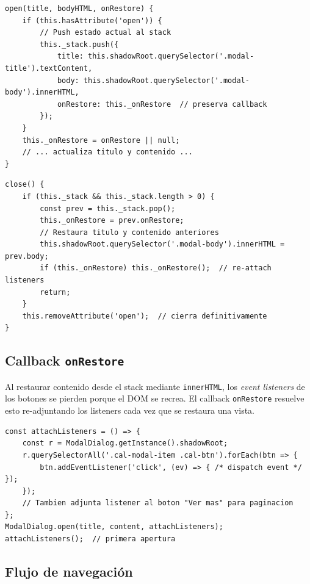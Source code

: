 \documentclass[12pt,a4paper]{article}
\begin{document}
\begin{lstlisting}[caption={Método \texttt{open()} con stack}, label=lst:stack-open]
open(title, bodyHTML, onRestore) {
    if (this.hasAttribute('open')) {
        // Push estado actual al stack
        this._stack.push({
            title: this.shadowRoot.querySelector('.modal-title').textContent,
            body: this.shadowRoot.querySelector('.modal-body').innerHTML,
            onRestore: this._onRestore  // preserva callback
        });
    }
    this._onRestore = onRestore || null;
    // ... actualiza titulo y contenido ...
}
\end{lstlisting}

\begin{lstlisting}[caption={Método \texttt{close()} con restauración}, label=lst:stack-close]
close() {
    if (this._stack && this._stack.length > 0) {
        const prev = this._stack.pop();
        this._onRestore = prev.onRestore;
        // Restaura titulo y contenido anteriores
        this.shadowRoot.querySelector('.modal-body').innerHTML = prev.body;
        if (this._onRestore) this._onRestore();  // re-attach listeners
        return;
    }
    this.removeAttribute('open');  // cierra definitivamente
}
\end{lstlisting}

\subsection{Callback \texttt{onRestore}}

Al restaurar contenido desde el stack mediante \texttt{innerHTML}, los \textit{event listeners} de los botones se pierden porque el DOM se recrea. El callback \texttt{onRestore} resuelve esto re-adjuntando los listeners cada vez que se restaura una vista.

\begin{lstlisting}[caption={Uso de onRestore en el calendario}, label=lst:onrestore]
const attachListeners = () => {
    const r = ModalDialog.getInstance().shadowRoot;
    r.querySelectorAll('.cal-modal-item .cal-btn').forEach(btn => {
        btn.addEventListener('click', (ev) => { /* dispatch event */ });
    });
    // Tambien adjunta listener al boton "Ver mas" para paginacion
};
ModalDialog.open(title, content, attachListeners);
attachListeners();  // primera apertura
\end{lstlisting}

\subsection{Flujo de navegación}
\end{document}
